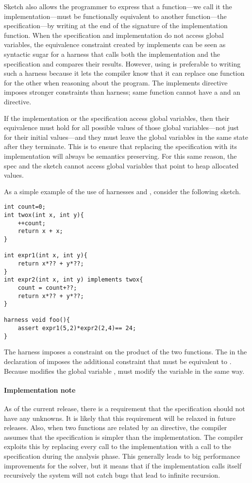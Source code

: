 Sketch also allows the programmer to express that a function---we call it the implementation---must be functionally equivalent to another function---the specification---by writing  at the end of the signature of the implementation function. When the specification and implementation do not access global variables, the equivalence constraint created by implements can be seen as syntactic sugar for a harness that calls both the implementation and the specification and compares their results. However, using  is preferable to writing such a harness because it lets the compiler know that it can replace one function for the other when reasoning about the program. The implements directive imposes stronger constraints than harness; same function cannot have a  and an  directive.

If the implementation or the specification access global variables, then their equivalence must hold for all possible values of those global variables---not just for their initial values---and they must leave the global variables in the same state after they terminate. This is to ensure that replacing the specification with its implementation will always be semantics preserving. For this same reason, the spec and the sketch cannot access global variables that point to heap allocated values.

\begin{Example}
As a simple example of the use of harnesses and , consider the following sketch.
\begin{lstlisting}
int count=0;
int twox(int x, int y){
	++count;
	return x + x;
}

int expr1(int x, int y){
	return x*?? + y*??;
}
int expr2(int x, int y) implements twox{
	count = count+??;
	return x*?? + y*??;
}

harness void foo(){
	assert expr1(5,2)*expr2(2,4)== 24;
}
\end{lstlisting}
The harness imposes a constraint on the product of the two functions. The  in the declaration of  imposes the additional constraint that  must be equivalent to . Because  modifies the global variable ,  must modify the variable in the same way.

\end{Example}

\paragraph{Implementation note} As of the current \Sk{} release, there is a requirement that the specification should not have any unknowns. It is likely that this requirement will be relaxed in future releases. Also, when two functions are related by an  directive, the compiler assumes that the specification is simpler than the implementation. The compiler exploits this by replacing every call to the implementation with a call to the specification during the analysis phase. This generally leads to big performance improvements for the solver, but it means that if the implementation calls itself recursively the system will not catch bugs that lead to infinite recursion. 


